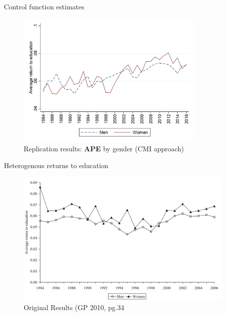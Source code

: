 \documentclass[10pt,ignorenonframetext,]{beamer}
\begin{document}
\begin{frame}[allowframebreaks]{Control function estimates}
\begin{figure}
\centering
\includegraphics[width=\textwidth,height=2.60417in]{img/results_sex.png}
\caption{Replication results: \textbf{APE} by gender (CMI approach)}
\end{figure}

\end{frame}

\begin{frame}{Heterogenous returns to education}
\protect\hypertarget{heterogenous-returns-to-education}{}

\begin{figure}
\centering
\includegraphics[width=\textwidth,height=2.60417in]{img/GP2010_CMI_gender.png}
\caption{Original Results (GP 2010, pg.34}
\end{figure}

\end{frame}
\end{document}
